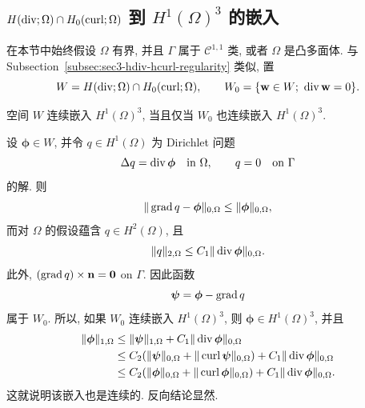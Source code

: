 \setcounter{subsection}{3}
\subsection{$H(\operatorname{div};\Omega)\cap H_0(\operatorname{curl};\Omega)$ 到 $H^1(\Omega)^3$ 的嵌入}
\label{subsec:sec3-hdiv-h0curl-embedding}

在本节中始终假设 $\Omega$ 有界, 并且 $\Gamma$ 属于 $\mathcal C^{1,1}$ 类,
或者 $\Omega$ 是凸多面体. 与 Subsection~\ref{subsec:sec3-hdiv-hcurl-regularity} 类似, 置
\[
W=H(\operatorname{div};\Omega)\cap H_0(\operatorname{curl};\Omega),
\qquad
W_0=\{\mathbf w\in W;\ \operatorname{div}\mathbf w=0\}.
\]

\setcounter{statement}{2}
\begin{Lemma}\label{lem:sec3-w-embedding-reduction}
空间 $W$ 连续嵌入 $H^1(\Omega)^3$, 当且仅当 $W_0$ 也连续嵌入
$H^1(\Omega)^3$.
\end{Lemma}
\begin{Proof}
设 $\boldsymbol\phi\in W$, 并令 $q\in H^1(\Omega)$ 为 Dirichlet 问题
\[
\Delta q=\operatorname{div}\boldsymbol\phi\quad\text{in }\Omega,
\qquad
q=0\quad\text{on }\Gamma
\]
的解. 则
\[
\|\operatorname{grad} q-\boldsymbol\phi\|_{0,\Omega}
\le\|\boldsymbol\phi\|_{0,\Omega},
\]
而对 $\Omega$ 的假设蕴含 $q\in H^2(\Omega)$, 且
\[
\|q\|_{2,\Omega}\le C_1\|\operatorname{div}\boldsymbol\phi\|_{0,\Omega}.
\]
此外, $(\operatorname{grad} q)\times\mathbf n=\mathbf0$ on $\Gamma$. 因此函数
\[
\boldsymbol\psi=\boldsymbol\phi-\operatorname{grad} q
\]
属于 $W_0$. 所以, 如果 $W_0$ 连续嵌入 $H^1(\Omega)^3$, 则
$\boldsymbol\phi\in H^1(\Omega)^3$, 并且
\begin{align*}
\|\boldsymbol\phi\|_{1,\Omega}
&\le\|\boldsymbol\psi\|_{1,\Omega}
+C_1\|\operatorname{div}\boldsymbol\phi\|_{0,\Omega}\\
&\le C_2(\|\boldsymbol\psi\|_{0,\Omega}
+\|\operatorname{curl}\boldsymbol\psi\|_{0,\Omega})
+C_1\|\operatorname{div}\boldsymbol\phi\|_{0,\Omega}\\
&\le C_2(\|\boldsymbol\phi\|_{0,\Omega}
+\|\operatorname{curl}\boldsymbol\phi\|_{0,\Omega})
+C_1\|\operatorname{div}\boldsymbol\phi\|_{0,\Omega}.
\end{align*}
这就说明该嵌入也是连续的. 反向结论显然.
\end{Proof}
